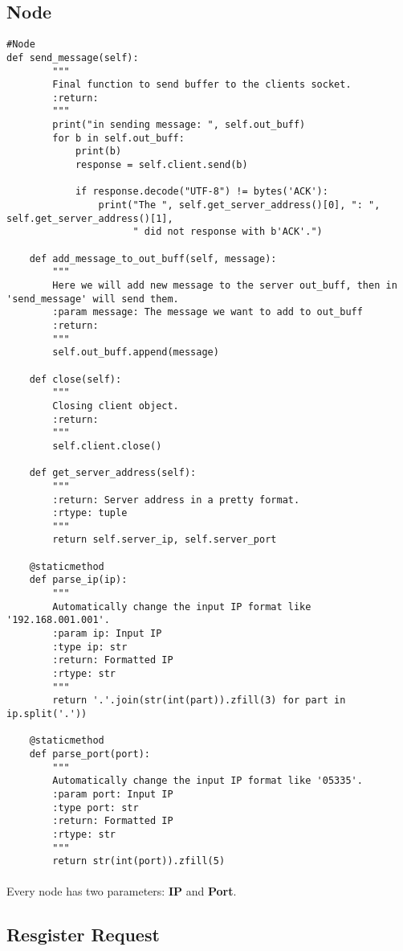 \documentclass{article}
\begin{document}
\subsection{Node}
\begin{lstlisting}
#Node
def send_message(self):
        """
        Final function to send buffer to the clients socket.
        :return:
        """
        print("in sending message: ", self.out_buff)
        for b in self.out_buff:
            print(b)
            response = self.client.send(b)

            if response.decode("UTF-8") != bytes('ACK'):
                print("The ", self.get_server_address()[0], ": ", self.get_server_address()[1],
                      " did not response with b'ACK'.")

    def add_message_to_out_buff(self, message):
        """
        Here we will add new message to the server out_buff, then in 'send_message' will send them.
        :param message: The message we want to add to out_buff
        :return:
        """
        self.out_buff.append(message)

    def close(self):
        """
        Closing client object.
        :return:
        """
        self.client.close()

    def get_server_address(self):
        """
        :return: Server address in a pretty format.
        :rtype: tuple
        """
        return self.server_ip, self.server_port

    @staticmethod
    def parse_ip(ip):
        """
        Automatically change the input IP format like '192.168.001.001'.
        :param ip: Input IP
        :type ip: str
        :return: Formatted IP
        :rtype: str
        """
        return '.'.join(str(int(part)).zfill(3) for part in ip.split('.'))

    @staticmethod
    def parse_port(port):
        """
        Automatically change the input IP format like '05335'.
        :param port: Input IP
        :type port: str
        :return: Formatted IP
        :rtype: str
        """
        return str(int(port)).zfill(5)
\end{lstlisting}
\paragraph{}Every node has two parameters: \textbf{IP} and \textbf{Port}.
\subsection{Resgister Request}
\end{document}
